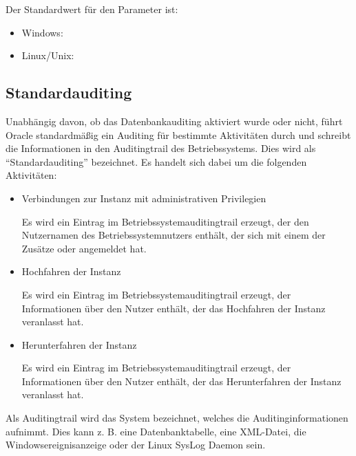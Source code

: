          Der Standardwert für den Parameter  ist:
          \begin{itemize}
            \item Windows: 
            \item Linux/Unix: 
          \end{itemize}

      \begin{literaturinternet}
        \item \cite{085271}
      \end{literaturinternet}
      \subsection{Standardauditing}
        Unabhängig davon, ob das Datenbankauditing aktiviert wurde oder nicht, führt Oracle standardmäßig ein Auditing für bestimmte Aktivitäten durch und schreibt die Informationen in den Auditingtrail des Betriebssystems. Dies wird als \enquote{Standardauditing} bezeichnet. Es handelt sich dabei um die folgenden Aktivitäten:
        \begin{itemize}
          \item Verbindungen zur Instanz mit administrativen Privilegien

            Es wird ein Eintrag im Betriebssystemauditingtrail erzeugt, der den Nutzernamen des Betriebssystemnutzers enthält, der sich mit einem der Zusätze  oder  angemeldet hat.
          \item Hochfahren der Instanz

            Es wird ein Eintrag im Betriebssystemauditingtrail erzeugt, der Informationen über den Nutzer enthält, der das Hochfahren der Instanz veranlasst hat.
          \item Herunterfahren der Instanz

            Es wird ein Eintrag im Betriebssystemauditingtrail erzeugt, der Informationen über den Nutzer enthält, der das Herunterfahren der Instanz veranlasst hat.
        \end{itemize}
        \begin{merke}
          Als Auditingtrail wird das System bezeichnet, welches die Auditinginformationen aufnimmt. Dies kann z. B. eine Datenbanktabelle, eine XML-Datei, die Windowsereignisanzeige oder der Linux SysLog Daemon sein.
        \end{merke}
